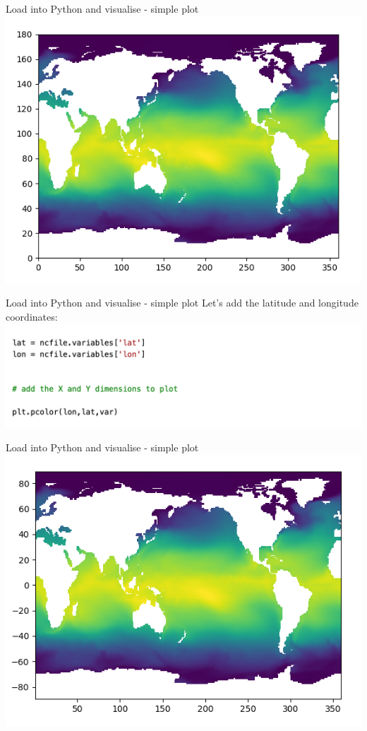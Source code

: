  
\begin{frame}{\insertsectionnumber{ |} Load into Python and visualise - simple plot} 
    \includegraphics[scale=0.45]{images/script1_fig1.png}
\end{frame}
 
  
\begin{frame}{\insertsectionnumber{ |} Load into Python and visualise - simple plot} 
    Let's add the latitude and longitude coordinates:\\
        \vspace{0.5cm}
    \includegraphics[scale=0.35]{images/Script1_step4.png}
\end{frame}
  
  
\begin{frame}{\insertsectionnumber{ |} Load into Python and visualise - simple plot} 
    \includegraphics[scale=0.45]{images/Script1_fig2.png}
\end{frame}
 

